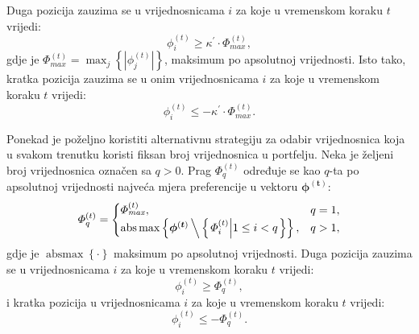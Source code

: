 \documentclass[lmodern, utf8, diplomski, numeric]{fer}
\newcommand{\matr}[1]{\mathbold{#1}}
\newcommand{\q}{\left}
\newcommand{\w}{\right}
\DeclareMathOperator*{\absmax}{abs\max}
\begin{document}
  Duga pozicija zauzima se u vrijednosnicama $i$ za koje u vremenskom koraku $t$ vrijedi:
  \begin{equation*}
  \phi_i^{\q(t\w)} \ge \kappa^\prime \cdot \Phi_\mathit{max}^{(t)},
  \end{equation*}
  gdje je $\Phi_\mathit{max}^{(t)} = \max_j \q\{ \q\lvert \phi_j^{(t)} \w\rvert \w\}$, maksimum po apsolutnoj vrijednosti.
  Isto tako, kratka pozicija zauzima se u onim vrijednosnicama $i$ za koje u vremenskom koraku $t$ vrijedi:
  \begin{equation*}
  \phi_i^{\q(t\w)} \le -\kappa^\prime \cdot \Phi_\mathit{max}^{(t)}.
  \end{equation*}
  
  Ponekad je poželjno koristiti alternativnu strategiju za odabir vrijednosnica koja u svakom trenutku koristi fiksan broj vrijednosnica u portfelju.
  Neka je željeni broj vrijednosnica označen sa $q > 0$.
  Prag $\Phi_q^{(t)}$ određuje se kao $q$-ta po apsolutnoj vrijednosti najveća mjera preferencije u vektoru $\matr{\phi^{(t)}}$:
  \begin{gather*}
  \Phi_q^{(t)} = \begin{cases}
  \Phi_\mathit{max}^{(t)}, & q = 1, \\
  \absmax \q\{ \matr{\phi^{(t)}}\, \middle\backslash\, \q\{ \q. \Phi_i^{(t)} \middle| 1 \le i < q \w. \w\} \w\}, & q > 1,
  \end{cases}
  \end{gather*}
  gdje je $\absmax \q\{ \cdot \w\}$ maksimum po apsolutnoj vrijednosti.
  Duga pozicija zauzima se u vrijednosnicama $i$ za koje u vremenskom koraku $t$ vrijedi:
  \begin{equation*}
  \phi_i^{\q(t\w)} \ge \Phi_q^{(t)},
  \end{equation*}
  i kratka pozicija u vrijednosnicama $i$ za koje u vremenskom koraku $t$ vrijedi:
  \begin{equation*}
  \phi_i^{\q(t\w)} \le -\Phi_q^{(t)}.
  \end{equation*}
  
\end{document}
